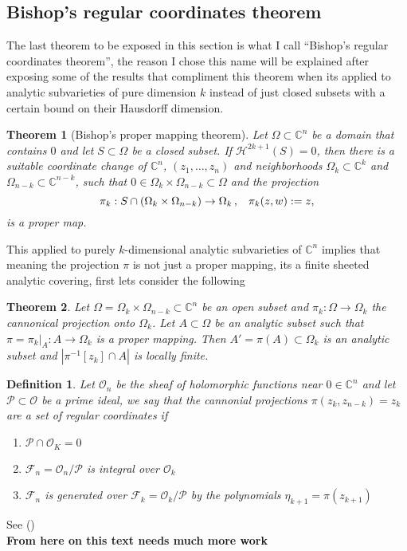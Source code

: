 \documentclass[12pt,twoside,a4paper]{report}
\newtheorem{definition}{Definition}[section]
\newtheorem{theorem}{Theorem}[section]
\newcommand{\co}{\ensuremath{\mathbb C }}
\newcommand{\con}{\ensuremath{\mathbb{C}^n}}
\newcommand{\osheaf}{\ensuremath{\mathcal O }}
\newcommand{\psheaf}{\ensuremath{\mathcal P }}
\begin{document}
\subsection{Bishop's regular coordinates theorem}
\noindent The last theorem to be exposed in this section is what I call ``Bishop's regular coordinates theorem'', the reason I chose this name will be explained after exposing some of the results that compliment this theorem when its applied to analytic subvarieties of pure dimension $k$ instead of just closed subsets with a certain bound on their Hausdorff dimension.
\begin{theorem}[Bishop's proper mapping theorem]\label{bishop mapping}
  Let $\Omega\subset\con$ be a domain that contains $0$ and let $S\subset\Omega$ be a closed subset. If $\mathcal{H}^{2k+1}(S)=0$, then there is a suitable coordinate change of $\con$, $(z_1,\ldots,z_n)$ and neighborhoods $\Omega_k\subset\co^k$ and $\Omega_{n-k}\subset\co^{n-k}$, such that $0\in\Omega_k\times\Omega_{n-k}\subset\Omega$ and the projection
        \[
          \pi_k:S\cap(\Omega_k\times\Omega_{n-k})\rightarrow\Omega_k\, ,\hspace{0.3cm}\pi_k(z,w):=z,
        \]
        \noindent is a proper map.
\end{theorem}
\noindent This applied to purely $k$-dimensional analytic subvarieties of $\con$ implies that meaning the projection $\pi$ is not just a proper mapping, its a finite sheeted analytic covering, first lets consider the following
\begin{theorem}
  Let $\Omega=\Omega_{k}\times\Omega_{n-k}\subset\con$ be an open subset and $\pi_{k}:\Omega\rightarrow\Omega_{k}$ the cannonical projection onto $\Omega_{k}$. Let $A\subset\Omega$ be an analytic subset such that $\pi=\pi_{k}\vert_{A}:A\rightarrow\Omega_{k}$ is a proper mapping. Then $A'=\pi(A)\subset\Omega_{k}$ is an analytic subset and $|\pi^{-1}[z_{k}]\cap A|$ is locally finite.
  \end{theorem}
  \begin{definition}

Let $\osheaf_{n}$ be the sheaf of holomorphic functions near $0\in\con$ and let $\psheaf\subset\osheaf$ be a prime ideal, we say that the cannonial projections $\pi(z_{k},z_{n-k})=z_{k}$ are a set of \emph{regular coordinates} if
    \begin{enumerate}
      \item[1] $\mathcal{P}\cap\osheaf_{K}=0$
      \item[2] $\mathcal{F}_{n}=\osheaf_{n}/\mathcal{P}$ is integral over $\mathcal{O}_{k}$
      \item[3] $\mathcal{F}_{n}$ is generated over $\mathcal{F}_{k}=\osheaf_{k}/\mathcal{P}$ by the polynomials $\eta_{k+1}=\pi(z_{k+1})$
    \end{enumerate}
  \end{definition}
  See (\cite{Gunning-Rossi})\\
\vspace{1cm}
{\Large\noindent\textbf{From here on this text needs much more work}}
\clearpage
\end{document}
